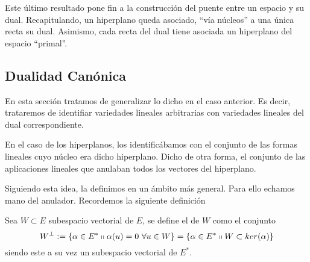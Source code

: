 Este último resultado pone fin a la construcción del puente entre un espacio y su dual. Recapitulando, un hiperplano queda asociado, ``vía núcleos'' a una única recta su dual. Asimismo, cada recta del dual tiene asociada un hiperplano del espacio ``primal''.
\subsection{Dualidad Canónica}
En esta sección tratamos de generalizar lo dicho en el caso anterior. Es decir, trataremos de identifiar variedades lineales arbitrarias con variedades lineales del dual correspondiente.

En el caso de los hiperplanos, los identificábamos con el conjunto de las formas lineales cuyo núcleo era dicho hiperplano. Dicho de otra forma, el conjunto de las aplicaciones lineales que anulaban todos los vectores del hiperplano.

Siguiendo esta idea, la definimos en un ámbito más general. Para ello echamos mano del anulador. Recordemos la siguiente definición
\begin{defi}
	Sea $W\subset E$ subespacio vectorial de $E$, se define el  de $W$ como el conjunto
	\begin{equation}
	W^{\perp}:=\{\alpha\in E^*\shortparallel \alpha(u)=0 \ \forall u\in W\}=\{\alpha\in E^*\shortparallel W\subset ker(\alpha)\}
	\end{equation}
	siendo este a su vez un subespacio vectorial de $E^*$.
\end{defi}

